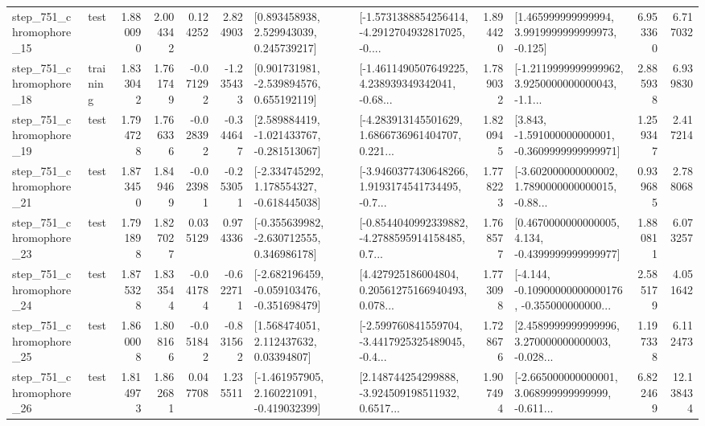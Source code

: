 \begin{tabular}{llrrrrllrlrr}
  step\_751\_chromophore\_15 &      test &      1.880090 &    2.004342 &      0.124252 &  2.824903 &     [0.893458938, 2.529943039, 0.245739217] &  [-1.5731388854256414, -4.2912704932817025, -0.... &       1.894420 &    [1.465999999999994, 3.9919999999999973, -0.125] &            6.953360 &          6.717032 \\
  step\_751\_chromophore\_18 &  training &      1.833042 &    1.761749 &     -0.071292 & -1.235433 &    [0.901731981, -2.539894576, 0.655192119] &  [-1.4611490507649225, 4.238939349342041, -0.68... &       1.789032 &  [-1.2119999999999962, 3.9250000000000043, -1.1... &            2.885938 &          6.939830 \\
  step\_751\_chromophore\_19 &      test &      1.794728 &    1.766336 &     -0.028392 & -0.344647 &   [2.589884419, -1.021433767, -0.281513067] &  [-4.283913145501629, 1.6866736961404707, 0.221... &       1.820945 &   [3.843, -1.591000000000001, -0.3609999999999971] &            1.259347 &          2.417214 \\
  step\_751\_chromophore\_21 &      test &      1.873450 &    1.849469 &     -0.023981 & -0.253051 &   [-2.334745292, 1.178554327, -0.618445038] &  [-3.9460377430648266, 1.9193174541734495, -0.7... &       1.778223 &  [-3.602000000000002, 1.7890000000000015, -0.88... &            0.939685 &          2.788068 \\
  step\_751\_chromophore\_23 &      test &      1.791898 &    1.827027 &      0.035129 &  0.974336 &   [-0.355639982, -2.630712555, 0.346986178] &  [-0.8544040992339882, -4.2788595914158485, 0.7... &       1.768577 &   [0.4670000000000005, 4.134, -0.4399999999999977] &            1.880811 &          6.073257 \\
  step\_751\_chromophore\_24 &      test &      1.875328 &    1.833544 &     -0.041784 & -0.622711 &  [-2.682196459, -0.059103476, -0.351698479] &  [4.427925186004804, 0.20561275166940493, 0.078... &       1.773098 &  [-4.144, -0.10900000000000176, -0.355000000000... &            2.585179 &          4.051642 \\
  step\_751\_chromophore\_25 &      test &      1.860008 &    1.808166 &     -0.051842 & -0.831562 &      [1.568474051, 2.112437632, 0.03394807] &  [-2.599760841559704, -3.4417925325489045, -0.4... &       1.728676 &  [2.4589999999999996, 3.270000000000003, -0.028... &            1.197338 &          6.112473 \\
  step\_751\_chromophore\_26 &      test &      1.814973 &    1.862681 &      0.047708 &  1.235511 &   [-1.461957905, 2.160221091, -0.419032399] &  [2.148744254299888, -3.924509198511932, 0.6517... &       1.907494 &  [-2.665000000000001, 3.068999999999999, -0.611... &            6.822469 &         12.138434 \\

\end{tabular}
